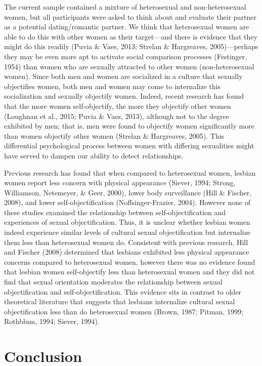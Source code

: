 \documentclass[man]{apa6}
\begin{document}
The current sample contained a mixture of heterosexual and
non-heterosexual women, but all participants were asked to think about
and evaluate their partner as a potential dating/romantic partner. We
think that heterosexual women are able to do this with other women as
their target---and there is evidence that they might do this readily
(Puvia \& Vaes, 2013; Strelan \& Hargreaves, 2005)---perhaps they may be
even more apt to activate social comparison processes (Festinger, 1954)
than women who are sexually attracted to other women (non-heterosexual
women). Since both men and women are socialized in a culture that
sexually objectifies women, both men and women may come to internalize
this socialization and sexually objectify women. Indeed, recent research
has found that the more women self-objectify, the more they objectify
other women (Loughnan et al., 2015; Puvia \& Vaes, 2013), although not
to the degree exhibited by men; that is, men were found to objectify
women significantly more than women objectify other women (Strelan \&
Hargreaves, 2005). This differential psychological process between women
with differing sexualities might have served to dampen our ability to
detect relationships.

Previous research has found that when compared to heterosexual women,
lesbian women report less concern with physical appearance (Siever,
1994; Strong, Williamson, Netemeyer, \& Geer, 2000), lower body
surveillance (Hill \& Fischer, 2008), and lower self-objectification
(Noffsinger-Frazier, 2004). However none of these studies examined the
relationship between self-objectification and experiences of sexual
objectification. Thus, it is unclear whether lesbian women indeed
experience similar levels of cultural sexual objectification but
internalize them less than heterosexual women do. Consistent with
previous research, Hill and Fischer (2008) determined that lesbians
exhibited less physical appearance concerns compared to heterosexual
women, however there was no evidence found that lesbian women
self-objectify less than heterosexual women and they did not find that
sexual orientation moderates the relationship between sexual
objectification and self-objectification. This evidence sits in contrast
to older theoretical literature that suggests that lesbians internalize
cultural sexual objectification less than do heterosexual women (Brown,
1987; Pitman, 1999; Rothblum, 1994; Siever, 1994).

\section{Conclusion}\label{conclusion}
\end{document}
